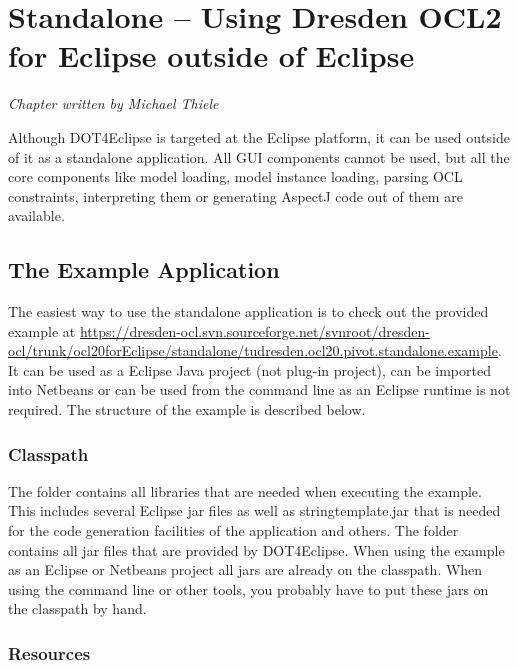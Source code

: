 \chapter{Standalone -- Using Dresden OCL2 for Eclipse outside of Eclipse}
\label{chapter:standalone}

\begin{flushright}
\textit{Chapter written by Michael Thiele}
\end{flushright}

Although \acl{DOT4Eclipse} is targeted at the Eclipse platform, it can be used outside of it as a standalone application. All GUI components cannot be used, but all the core components like model loading, model instance loading, parsing OCL constraints, interpreting them or generating AspectJ code out of them are available.


\section{The Example Application}

The easiest way to use the standalone application is to check out the provided example at \url{https://dresden-ocl.svn.sourceforge.net/svnroot/dresden-ocl/trunk/ocl20forEclipse/standalone/tudresden.ocl20.pivot.standalone.example}. It can be used as a Eclipse Java project (not plug-in project), can be imported into Netbeans or can be used from the command line as an Eclipse runtime is not required. The structure of the example is described below.


\subsection{Classpath}

The  folder contains all libraries that are needed when executing the example. This includes several Eclipse jar files as well as stringtemplate.jar that is needed for the code generation facilities of the application and others. The  folder contains all jar files that are provided by \acl{DOT4Eclipse}. When using the example as an Eclipse or Netbeans project all jars are already on the classpath. When using the command line or other tools, you probably have to put these jars on the classpath by hand.


\subsection{Resources}

